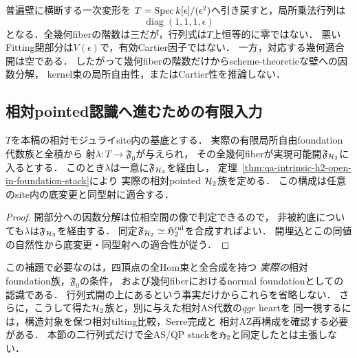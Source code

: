 \begin{example}[非被約底での階数三条件]
普遍壁に横断する一次変形を
$T=\operatorname{Spec} k[\epsilon]/(\epsilon^2)$へ引き戻すと，局所乗法行列は
\[
 \operatorname{diag}(1,1,1,\epsilon)
\]
となる．全幾何fiberの階数は三だが，行列式は$T$上恒等的に零ではない．
悪いFitting閉部分は$V(\epsilon)$で，有効Cartier因子ではない．
一方，対応する幾何適合開は空である．
したがって幾何fiberの階数だけからscheme-theoreticな壁への因数分解，
kernel束の局所自由性，またはCartier性を推論しない．
\end{example}

\subsection{相対pointed認識へ進むための有限入力}

\begin{lemma}
\label{lem:qa-relative-foundation-open-factorization}
$T$を本稿の相対モジュライsite内の基底とする．
実際の有限局所自由foundation代数族と全積から
射$\lambda:T\to\mathfrak F_0$が与えられ，
その全幾何fiberが実現可能開$\mathfrak F_{\mathcal H_2}$に入るとする．
このとき$\lambda$は一意に$\mathfrak F_{\mathcal H_2}$を経由し，
定理~\ref{thm:qa-intrinsic-h2-open-in-foundation-stack}により
実際の相対pointed $\mathcal H_2$族を定める．
この構成は任意のsite内の底変更と同型射に適合する．
\end{lemma}
\begin{proof}
開部分への因数分解は位相空間の像で判定できるので，
非被約底についても$\lambda$は$\mathfrak F_{\mathcal H_2}$を経由する．
同定$\mathfrak F_{\mathcal H_2}\simeq\mathfrak H_2^{\mathrm{rul}}$を合成すればよい．
開埋込とこの同値の自然性から底変更・同型射への適合性が従う．
\end{proof}

この補題で必要なのは，四頂点の全Hom束と全合成を持つ
\emph{実際の}相対foundation族，$\mathfrak F_0$の条件，
および幾何fiberにおけるnormal foundationとしての認識である．
行列式開の上にあるという事実だけからこれらを省略しない．
さらに，こうして得た$\mathcal H_2$族と，別に与えた相対AS代数の$qgr$ heartを
同一視するには，構造対象を保つ相対tilting比較，Serre完成と
相対AZ再構成を確認する必要がある．
本節の二行列式だけで全AS/QP stackを$\mathfrak H_2$と同定したとは主張しない．
